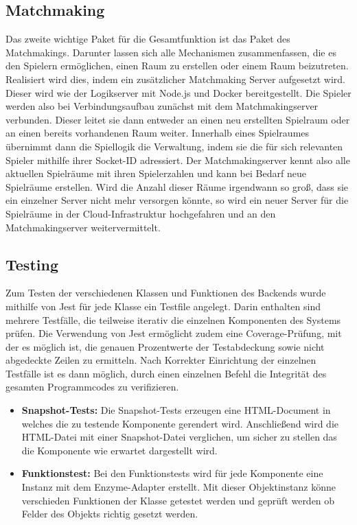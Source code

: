 \documentclass[conference]{IEEEtran}
\begin{document}
\subsection{Matchmaking}
Das zweite wichtige Paket für die Gesamtfunktion ist das Paket des Matchmakings. Darunter lassen sich alle Mechanismen zusammenfassen, die es den Spielern ermöglichen, einen Raum zu erstellen oder einem Raum beizutreten. Realisiert wird dies, indem ein zusätzlicher Matchmaking Server aufgesetzt wird. Dieser wird wie der Logikserver mit Node.js und Docker bereitgestellt. Die Spieler werden also bei Verbindungsaufbau zunächst mit dem Matchmakingserver verbunden. Dieser leitet sie dann entweder an einen neu erstellten Spielraum oder an einen bereits vorhandenen Raum weiter. Innerhalb eines Spielraumes übernimmt dann die Spiellogik die Verwaltung, indem sie die für sich relevanten Spieler mithilfe ihrer Socket-ID adressiert. Der Matchmakingserver kennt also alle aktuellen Spielräume mit ihren Spielerzahlen und kann bei Bedarf neue Spielräume erstellen. Wird die Anzahl dieser Räume irgendwann so groß, dass sie ein einzelner Server nicht mehr versorgen könnte, so wird ein neuer Server für die Spielräume in der Cloud-Infrastruktur hochgefahren und an den Matchmakingserver weitervermittelt.

\subsection{Testing}
Zum Testen der verschiedenen Klassen und Funktionen des Backends wurde mithilfe von Jest für jede Klasse ein Testfile angelegt. Darin enthalten sind mehrere Testfälle, die teilweise iterativ die einzelnen Komponenten des Systems prüfen. Die Verwendung von Jest ermöglicht zudem eine Coverage-Prüfung, mit der es möglich ist, die genauen Prozentwerte der Testabdeckung sowie nicht abgedeckte Zeilen zu ermitteln. Nach Korrekter Einrichtung der einzelnen Testfälle ist es dann möglich, durch einen einzelnen Befehl die Integrität des gesamten Programmcodes zu verifizieren.

\begin{itemize}
    \item \textbf{Snapshot-Tests:}
    Die Snapshot-Tests erzeugen eine HTML-Document in welches die zu testende Komponente gerendert wird.
    Anschließend wird die HTML-Datei mit einer Snapshot-Datei verglichen, um sicher zu stellen das die Komponente wie erwartet dargestellt wird.
    \item \textbf{Funktionstest:}
    Bei den Funktionstests wird für jede Komponente eine Instanz mit dem Enzyme-Adapter erstellt.
    Mit dieser Objektinstanz könne verschieden Funktionen der Klasse getestet werden und geprüft werden ob Felder des Objekts richtig gesetzt werden.
\end{itemize}
\end{document}
